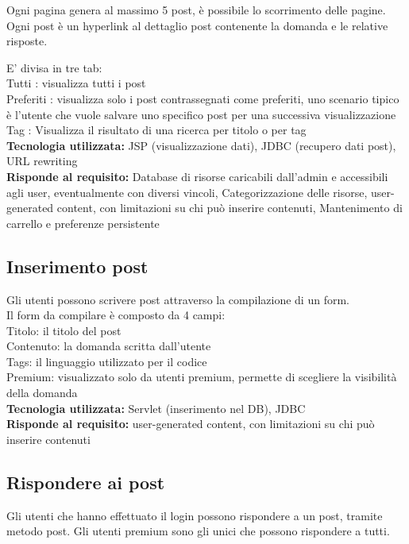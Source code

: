 \documentclass{article} %
\begin{document}
    Ogni pagina genera al massimo 5 post, è possibile lo scorrimento delle pagine.
    Ogni post è un hyperlink al dettaglio post contenente la domanda e le relative risposte.

    E' divisa in tre tab: \\
    Tutti : visualizza tutti i post \\
    Preferiti : visualizza solo i post contrassegnati come preferiti, uno scenario tipico è l'utente che vuole salvare uno specifico post per una successiva visualizzazione \\
    Tag : Visualizza il risultato di una ricerca per titolo o per tag \\
    
    


    \textbf{Tecnologia utilizzata:} JSP (visualizzazione dati), JDBC (recupero dati post), URL rewriting \\
    \textbf{Risponde al requisito:} Database di risorse caricabili dall’admin e accessibili agli user, eventualmente con diversi vincoli, Categorizzazione delle risorse, user-generated content, con limitazioni su chi può inserire contenuti, Mantenimento di carrello e preferenze persistente

    \subsection{Inserimento post}
    Gli utenti possono scrivere post attraverso la compilazione di un form. \\
    Il form da compilare è composto da 4 campi: \\
    Titolo: il titolo del post\\
    Contenuto: la domanda scritta dall'utente \\
    Tags: il linguaggio utilizzato per il codice \\
    Premium: visualizzato solo da utenti premium, permette di scegliere la visibilità della domanda \\
    \textbf{Tecnologia utilizzata:} Servlet (inserimento nel DB), JDBC \\
    \textbf{Risponde al requisito:} 
    user-generated content, con limitazioni su chi può inserire contenuti

    \subsection{Rispondere ai post}
    Gli utenti che hanno effettuato il login possono rispondere a un post, tramite metodo post.
    Gli utenti premium sono gli unici che possono rispondere a tutti. \\
\end{document}
